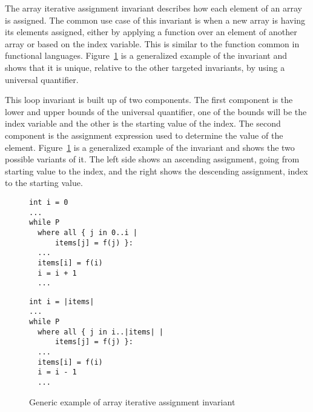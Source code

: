 
The array iterative assignment invariant describes how each element
of an array is assigned.
The common use case of this invariant is when a new array is having
its elements assigned, either by applying a function over an element
of another array or based on the index variable.
This is similar to the  function common in functional languages.
Figure~\ref{lst:array-iter-gen} is a generalized example of the invariant 
and shows that it is unique, relative to the other targeted invariants, by
using a universal quantifier.

This loop invariant is built up of two components.
The first component is the lower and upper bounds of the
universal quantifier, one of the bounds will be the index
variable and the other is the starting value of the index.
The second component is the assignment expression used to
determine the value of the element.
Figure~\ref{lst:array-iter-gen} is a generalized example of the invariant 
and shows the two possible variants of it.
The left side shows an ascending assignment, going from starting value to the index, and
the right shows the descending assignment, index to the starting value.


\begin{figure}[ht]
\noindent
\begin{minipage}{.45\textwidth}
\begin{lstlisting}
int i = 0
...
while P
  where all { j in 0..i |
      items[j] = f(j) }:
  ...
  items[i] = f(i)
  i = i + 1
  ...
\end{lstlisting}
\end{minipage}\hfill
\begin{minipage}{.45\textwidth}
\begin{lstlisting}
int i = |items|
...
while P
  where all { j in i..|items| |
      items[j] = f(j) }:
  ...
  items[i] = f(i)
  i = i - 1
  ...
\end{lstlisting}
\end{minipage}
\caption{Generic example of array iterative assignment invariant}
\label{lst:array-iter-gen}
\end{figure}

